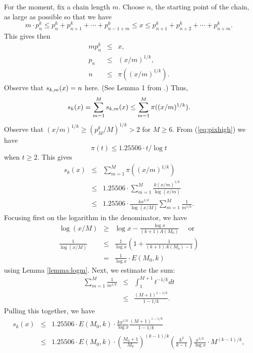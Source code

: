 \documentclass[11pt]{amsart}
\numberwithin{equation}{section}
\numberwithin{algorithm}{section}
\begin{document}
For the moment, fix a chain length $m$.  
Choose $n$, the starting point of the chain, as large as possible so that we have
$$m\cdot p_n^k \leq p_n^k + p_{n+1}^k + \cdots + p_{n-1+m}^k \leq x \leq  p_{n+1}^k + p_{n+2}^k + \cdots + p_{n+m}^k.$$
This gives then
\begin{eqnarray*}
    mp_n^k &\le& x, \\
    p_n &\le& (x/m)^{1/k}, \\
    n &\le& \pi( (x/m)^{1/k} ) .
\end{eqnarray*}
Observe that ${s_{k,m}}(x) = n$ here.  (See Lemma 1 from \cite{OSS2024}.)
Thus,
$$
{s_k}(x) = \sum_{m=1}^M {s_{k,m}}(x) \le \sum_{m=1}^M \pi( (x/m)^{1/k} ).
$$
Observe that $(x/m)^{1/k}\ge ( p_M^k/M )^{1/k}>2$ for $M\ge 6$.
From (\ref{eq:pixhigh}) we have %
$$
\pi(t) \le 1.25506\cdot t/\log t
$$
when $t\ge 2$.
This gives
\begin{eqnarray*}
    s_k(x) &\le& \sum_{m=1}^M \pi( (x/m)^{1/k} )\\
    &\le& 1.25506 \cdot \sum_{m=1}^M \frac{k (x/m)^{1/k}}{\log(x/m)} \\
    &\le& 1.25506 \cdot \frac{k x^{1/k}}{\log(x/M)} \sum_{m=1}^M \frac{1}{m^{1/k}}.
\end{eqnarray*}
Focusing first on the logarithm in the denominator, we have
\begin{eqnarray*}
  \log(x/M) &\ge& \log x - \frac{\log x}{(k+1)A(M_0)} \quad\mbox{ or }\\
    \frac{1}{\log(x/M)} &\le& 
      \frac{1}{\log x} \left(1+\frac{1}{(k+1)A(M_0)-1}\right) \\
      &=& \frac{1}{\log x} \cdot E(M_0,k)
\end{eqnarray*}
using Lemma \ref{lemma:logm}.
Next, we estimate the sum:
\begin{eqnarray*}
    \sum_{m=1}^M \frac{1}{m^{1/k}} &\le& \int_1^{M+1} t^{-1/k} dt \\
      & \le & \frac{(M+1)^{1-1/k}}{1-1/k}.
\end{eqnarray*}
Pulling this together, we have
\begin{eqnarray*}
s_k(x) &\le& 1.25506 \cdot E(M_0,k)\cdot \frac{kx^{1/k}}{\log x} \frac{(M+1)^{1-1/k}}{1-1/k} \\
 &\le& 1.25506 \cdot E(M_0,k)
 \cdot \left(\frac{M_0+1}{M_0} \right)^{(k-1)/k}
 \left(\frac{k^2}{k-1}\right) 
 \frac{x^{1/k}}{\log x} \cdot M^{(k-1)/k},
\end{eqnarray*}
\end{document}
